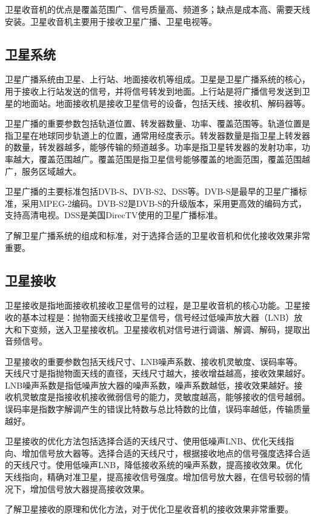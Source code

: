 \documentclass[12pt,UTF8]{ctexbook}
\begin{document}
卫星收音机的优点是覆盖范围广、信号质量高、频道多；缺点是成本高、需要天线安装。卫星收音机主要用于接收卫星广播、卫星电视等。

\subsection{卫星系统}

卫星广播系统由卫星、上行站、地面接收机等组成。卫星是卫星广播系统的核心，用于接收上行站发送的信号，并将信号转发到地面。上行站是将广播信号发送到卫星的地面站。地面接收机是接收卫星信号的设备，包括天线、接收机、解码器等。

卫星广播的重要参数包括轨道位置、转发器数量、功率、覆盖范围等。轨道位置是指卫星在地球同步轨道上的位置，通常用经度表示。转发器数量是指卫星上转发器的数量，转发器越多，能够传输的频道越多。功率是指卫星转发器的发射功率，功率越大，覆盖范围越广。覆盖范围是指卫星信号能够覆盖的地面范围，覆盖范围越广，服务区域越大。

卫星广播的主要标准包括DVB-S、DVB-S2、DSS等。DVB-S是最早的卫星广播标准，采用MPEG-2编码。DVB-S2是DVB-S的升级版本，采用更高效的编码方式，支持高清电视。DSS是美国DirecTV使用的卫星广播标准。

了解卫星广播系统的组成和标准，对于选择合适的卫星收音机和优化接收效果非常重要。

\subsection{卫星接收}

卫星接收是指地面接收机接收卫星信号的过程，是卫星收音机的核心功能。卫星接收的基本过程是：抛物面天线接收卫星信号，信号经过低噪声放大器（LNB）放大和下变频，送入卫星接收机。卫星接收机对信号进行调谐、解调、解码，提取出音频信号。

卫星接收的重要参数包括天线尺寸、LNB噪声系数、接收机灵敏度、误码率等。天线尺寸是指抛物面天线的直径，天线尺寸越大，接收增益越高，接收效果越好。LNB噪声系数是指低噪声放大器的噪声系数，噪声系数越低，接收效果越好。接收机灵敏度是指接收机接收微弱信号的能力，灵敏度越高，能够接收的信号越弱。误码率是指数字解调产生的错误比特数与总比特数的比值，误码率越低，传输质量越好。

卫星接收的优化方法包括选择合适的天线尺寸、使用低噪声LNB、优化天线指向、增加信号放大器等。选择合适的天线尺寸，根据接收地点的信号强度选择合适的天线尺寸。使用低噪声LNB，降低接收系统的噪声系数，提高接收效果。优化天线指向，精确对准卫星，提高接收信号强度。增加信号放大器，在信号较弱的情况下，增加信号放大器提高接收效果。

了解卫星接收的原理和优化方法，对于优化卫星收音机的接收效果非常重要。
\end{document}
